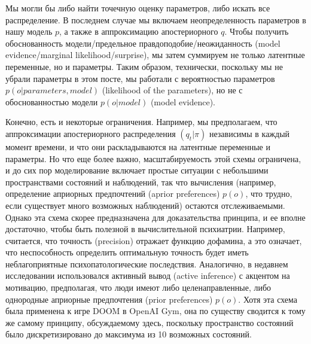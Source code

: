 \documentclass[12pt]{article}
\begin{document}

Мы могли бы либо найти точечную оценку параметров, либо искать все распределение. В последнем случае мы включаем неопределенность параметров в нашу модель $p$, а также в аппроксимацию апостериорного $q$. Чтобы получить обоснованность модели/предельное правдоподобие/неожиданность (model evidence/marginal likelihood/surprise), мы затем суммируем не только латентные переменные, но и параметры. Таким образом, технически, поскольку мы не убрали параметры в этом посте, мы работали с вероятностью параметров $p(o|parameters, model)$ (likelihood of the parameters), но не с обоснованностью модели $p(o|model)$ (model evidence).


Конечно, есть и некоторые ограничения. Например, мы предполагаем, что аппроксимации апостериорного распределения $(q_t|\pi)$ независимы в каждый момент времени, и что они раскладываются на латентные переменные и параметры. Но что еще более важно, масштабируемость этой схемы ограничена, и до сих пор моделирование включает простые ситуации с небольшими пространствами состояний и наблюдений, так что вычисления (например, определение априорных предпочтений (aprior preferences) $p(o)$, что трудно, если существует много возможных наблюдений) остаются отслеживаемыми. Однако эта схема скорее предназначена для доказательства принципа, и ее вполне достаточно, чтобы быть полезной в вычислительной психиатрии. Например, считается, что точность (precision) отражает функцию дофамина, а это означает, что неспособность определить оптимальную точность будет иметь неблагоприятные психопатологические последствия. Аналогично, в недавнем исследовании использовался активный вывод (active inference) с акцентом на мотивацию, предполагая, что люди имеют либо целенаправленные, либо однородные априорные предпочтения (prior preferences) $p(o)$. Хотя эта схема была применена к игре DOOM в OpenAI Gym, она по существу сводится к тому же самому принципу, обсуждаемому здесь, поскольку пространство состояний было дискретизировано до максимума из 10 возможных состояний.
\end{document}

